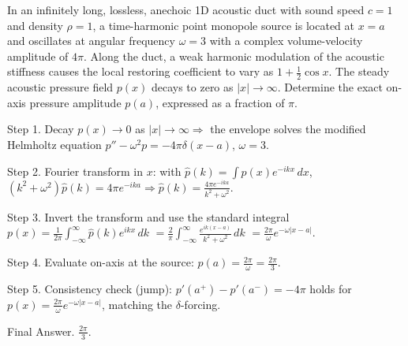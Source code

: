 In an infinitely long, lossless, anechoic 1D acoustic duct with sound speed $c=1$ and density $\rho=1$, a time-harmonic point monopole source is located at $x=a$ and oscillates at angular frequency $\omega=3$ with a complex volume-velocity amplitude of $4\pi$. Along the duct, a weak harmonic modulation of the acoustic stiffness causes the local restoring coefficient to vary as $1 + \frac{1}{2} \cos x$. The steady acoustic pressure field $p(x)$ decays to zero as $|x| \to \infty$. Determine the exact on-axis pressure amplitude $p(a)$, expressed as a fraction of $\pi$.

Step 1. Decay $p(x) \to 0$ as $|x| \to \infty \Rightarrow$ the envelope solves the modified Helmholtz equation $p'' - \omega^2 p = -4\pi \delta(x-a)$, $\omega=3$.

Step 2. Fourier transform in $x$: with $\hat{p}(k) = \int p(x) e^{-i k x} \, dx$, $(k^2 + \omega^2) \hat{p}(k) = 4\pi e^{-i k a} \Rightarrow \hat{p}(k) = \frac{4\pi e^{-i k a}}{k^2 + \omega^2}$.

Step 3. Invert the transform and use the standard integral $p(x) = \frac{1}{2\pi} \int_{-\infty}^{\infty} \hat{p}(k) e^{i k x} \, dk$ $= \frac{2}{\pi} \int_{-\infty}^{\infty} \frac{e^{i k (x-a)}}{k^2 + \omega^2} \, dk$ $= \frac{2\pi}{\omega} e^{-\omega |x-a|}$.

Step 4. Evaluate on-axis at the source: $p(a) = \frac{2\pi}{\omega} = \frac{2\pi}{3}$.

Step 5. Consistency check (jump): $p'(a^+) - p'(a^-) = -4\pi$ holds for $p(x) = \frac{2\pi}{\omega} e^{-\omega |x-a|}$, matching the $\delta$-forcing.

Final Answer. $\displaystyle \frac{2\pi}{3}$.